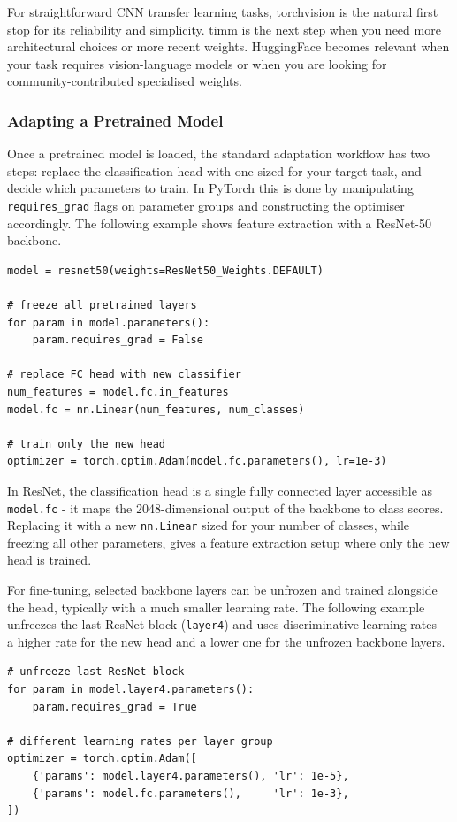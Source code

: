 For straightforward CNN transfer learning tasks, torchvision is the natural first stop for its reliability and simplicity. timm is the next step when you need more architectural choices or more recent weights. HuggingFace becomes relevant when your task requires vision-language models or when you are looking for community-contributed specialised weights.

\subsubsection{Adapting a Pretrained Model}

Once a pretrained model is loaded, the standard adaptation workflow has two steps: replace the classification head with one sized for your target task, and decide which parameters to train. In PyTorch this is done by manipulating \texttt{requires\_grad} flags on parameter groups and constructing the optimiser accordingly. The following example shows feature extraction with a ResNet-50 backbone.

\begin{verbatim}
model = resnet50(weights=ResNet50_Weights.DEFAULT)

# freeze all pretrained layers
for param in model.parameters():
    param.requires_grad = False

# replace FC head with new classifier
num_features = model.fc.in_features
model.fc = nn.Linear(num_features, num_classes)

# train only the new head
optimizer = torch.optim.Adam(model.fc.parameters(), lr=1e-3)
\end{verbatim}

In ResNet, the classification head is a single fully connected layer accessible as \texttt{model.fc} - it maps the 2048-dimensional output of the backbone to class scores. Replacing it with a new \texttt{nn.Linear} sized for your number of classes, while freezing all other parameters, gives a feature extraction setup where only the new head is trained.

For fine-tuning, selected backbone layers can be unfrozen and trained alongside the head, typically with a much smaller learning rate. The following example unfreezes the last ResNet block (\texttt{layer4}) and uses discriminative learning rates - a higher rate for the new head and a lower one for the unfrozen backbone layers.

\begin{verbatim}
# unfreeze last ResNet block
for param in model.layer4.parameters():
    param.requires_grad = True

# different learning rates per layer group
optimizer = torch.optim.Adam([
    {'params': model.layer4.parameters(), 'lr': 1e-5},
    {'params': model.fc.parameters(),     'lr': 1e-3},
])
\end{verbatim}

